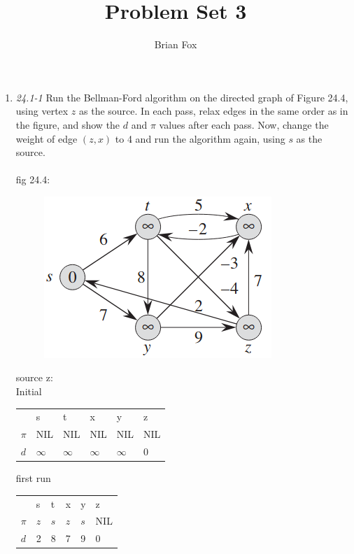 \documentclass[]{memoir}
\title{Problem Set 3}
\author{Brian Fox}
\date{}
\begin{document}
\maketitle

\begin{enumerate}
\item \textit{24.1-1} Run the Bellman-Ford algorithm on the directed graph of Figure 24.4, using vertex $z$ as the source. In each pass, relax edges in the same order as in the figure, and show the $d$ and $\pi$ values after each pass. Now, change the weight of edge $(z,x)$ to 4 and run the algorithm again, using $s$ as the source.
\paragraph{} fig 24.4:
\begin{figure}[h]
	\centering
	\includegraphics[scale=.7]{fig24-4}
\end{figure}

source z:\\
Initial
\begin{table}[h]
\begin{tabular}{l|l|l|l|l|l}
      & s        & t        & x        & y        & z   \\
$\pi$ & NIL      & NIL      & NIL      & NIL      & NIL \\
$d$   & $\infty$ & $\infty$ & $\infty$ & $\infty$ & 0  
\end{tabular}
\end{table}

first run 
\begin{table}[h!]
\begin{tabular}{l|l|l|l|l|l}
      & s   & t   & x   & y   & z   \\
$\pi$ & $z$ & $s$ & $z$ & $s$ & NIL \\
$d$   & 2   & 8   & 7   & 9   & 0  
\end{tabular}
\end{table}


\end{enumerate}
\end{document}
